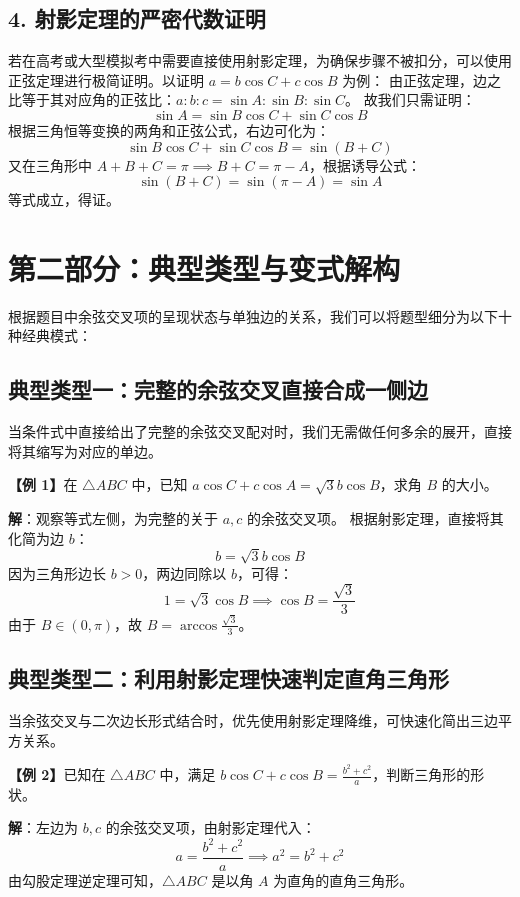 \documentclass[11pt, a4paper]{ctexart}
\begin{document}
\subsection{4. 射影定理的严密代数证明}
若在高考或大型模拟考中需要直接使用射影定理，为确保步骤不被扣分，可以使用正弦定理进行极简证明。以证明 $a = b\cos C + c\cos B$ 为例：
由正弦定理，边之比等于其对应角的正弦比：$a : b : c = \sin A : \sin B : \sin C$。
故我们只需证明：
\[
\sin A = \sin B\cos C + \sin C\cos B
\]
根据三角恒等变换的两角和正弦公式，右边可化为：
\[
\sin B\cos C + \sin C\cos B = \sin(B+C)
\]
又在三角形中 $A+B+C = \pi \implies B+C = \pi - A$，根据诱导公式：
\[
\sin(B+C) = \sin(\pi - A) = \sin A
\]
等式成立，得证。

\newpage

\section{第二部分：典型类型与变式解构}

根据题目中余弦交叉项的呈现状态与单独边的关系，我们可以将题型细分为以下十种经典模式：

\subsection{典型类型一：完整的余弦交叉直接合成一侧边}
当条件式中直接给出了完整的余弦交叉配对时，我们无需做任何多余的展开，直接将其缩写为对应的单边。
\begin{tcolorbox}[colback=white, colframe=black!60, boxrule=0.5pt, arc=1pt, before skip=0.2em, after skip=0.2em]
\textbf{【例 1】}在 $\triangle ABC$ 中，已知 $a\cos C + c\cos A = \sqrt{3}b\cos B$，求角 $B$ 的大小。
\end{tcolorbox}
\textbf{解}：观察等式左侧，为完整的关于 $a, c$ 的余弦交叉项。
根据射影定理，直接将其化简为边 $b$：
\[
b = \sqrt{3}b\cos B
\]
因为三角形边长 $b > 0$，两边同除以 $b$，可得：
\[
1 = \sqrt{3}\cos B \implies \cos B = \frac{\sqrt{3}}{3}
\]
由于 $B \in (0, \pi)$，故 $B = \arccos\frac{\sqrt{3}}{3}$。

\subsection{典型类型二：利用射影定理快速判定直角三角形}
当余弦交叉与二次边长形式结合时，优先使用射影定理降维，可快速化简出三边平方关系。
\begin{tcolorbox}[colback=white, colframe=black!60, boxrule=0.5pt, arc=1pt, before skip=0.2em, after skip=0.2em]
\textbf{【例 2】}已知在 $\triangle ABC$ 中，满足 $b\cos C + c\cos B = \frac{b^2+c^2}{a}$，判断三角形的形状。
\end{tcolorbox}
\textbf{解}：左边为 $b, c$ 的余弦交叉项，由射影定理代入：
\[
a = \frac{b^2+c^2}{a} \implies a^2 = b^2 + c^2
\]
由勾股定理逆定理可知，$\triangle ABC$ 是以角 $A$ 为直角的直角三角形。
\end{document}
